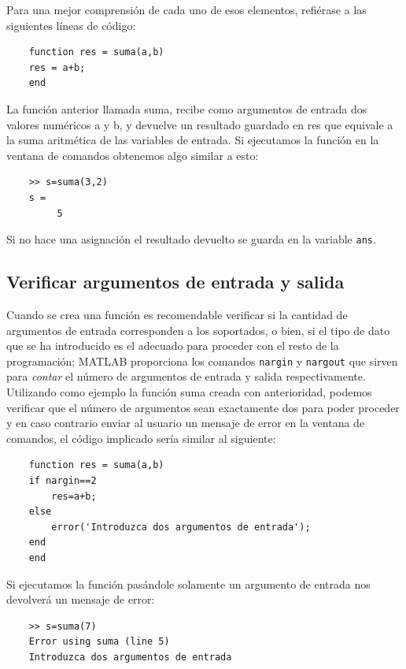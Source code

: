 Para una mejor comprensión de cada uno de esos elementos, refiérase a las siguientes 
líneas de código:

\begin{verbatim}
	function res = suma(a,b)
	res = a+b;
	end
\end{verbatim}

La función anterior llamada suma, recibe como argumentos de entrada dos valores numéricos 
a y b, y devuelve un resultado guardado en res que equivale a la suma aritmética de las 
variables de entrada. Si ejecutamos la función en la ventana de comandos obtenemos 
algo similar a esto:

\begin{verbatim}
	>> s=suma(3,2)
	s =
	     5
\end{verbatim}

Si no hace una asignación el resultado devuelto se guarda en la variable \texttt{ans}.

\subsection{Verificar argumentos de entrada y salida}

Cuando se crea una función es recomendable verificar si la cantidad de argumentos de 
entrada corresponden a los soportados, o bien, si el tipo de dato que se ha introducido 
es el adecuado para proceder con el resto de la programación; MATLAB proporciona los 
comandos \texttt{nargin} y \texttt{nargout} que sirven para \textit{contar} el número de argumentos de 
entrada y salida respectivamente.\\

Utilizando como ejemplo la función suma creada con anterioridad, podemos verificar que 
el número de argumentos sean exactamente dos para poder proceder y en caso contrario 
enviar al usuario un mensaje de error en la ventana de comandos, el código implicado 
sería similar al siguiente:

\begin{verbatim}
	function res = suma(a,b)
	if nargin==2
	    res=a+b;
	else
	    error('Introduzca dos argumentos de entrada');
	end
	end
\end{verbatim}

Si ejecutamos la función pasándole solamente un argumento de entrada nos devolverá un mensaje de error:

\begin{verbatim}
	>> s=suma(7)
	Error using suma (line 5)
	Introduzca dos argumentos de entrada
\end{verbatim}

